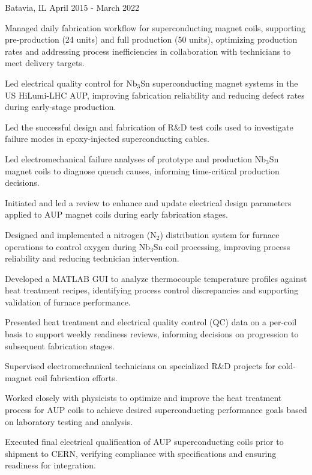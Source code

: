 \begin{cventries}
{Batavia, IL}
{April 2015 - March 2022}
{
\begin{cvitems}
\item {Managed daily fabrication workflow for superconducting magnet coils, supporting pre-production (24 units) and full production (50 units), optimizing production rates and addressing process inefficiencies in collaboration with technicians to meet delivery targets.}
\item {Led electrical quality control for Nb$_3$Sn superconducting magnet systems in the US HiLumi-LHC AUP, improving fabrication reliability and reducing defect rates during early-stage production.}
\item {Led the successful design and fabrication of R\&D test coils used to investigate failure modes in epoxy-injected superconducting cables.}
\item {Led electromechanical failure analyses of prototype and production Nb$_3$Sn magnet coils to diagnose quench causes, informing time-critical production decisions.}
\item {Initiated and led a review to enhance and update electrical design parameters applied to AUP magnet coils during early fabrication stages.}
\item {Designed and implemented a nitrogen (N$_2$) distribution system for furnace operations to control oxygen during Nb$_3$Sn coil processing, improving process reliability and reducing technician intervention.}
\item {Developed a MATLAB GUI to analyze thermocouple temperature profiles against heat treatment recipes, identifying process control discrepancies and supporting validation of furnace performance.}
\item {Presented heat treatment and electrical quality control (QC) data on a per-coil basis to support weekly readiness reviews, informing decisions on progression to subsequent fabrication stages.}
\item {Supervised electromechanical technicians on specialized R\&D projects for cold-magnet coil fabrication efforts.}
\item {Worked closely with physicists to optimize and improve the heat treatment process for AUP coils to achieve desired superconducting performance goals based on laboratory testing and analysis.}
\item {Executed final electrical qualification of AUP superconducting coils prior to shipment to CERN, verifying compliance with specifications and ensuring readiness for integration.}
\end{cvitems}
}
\vspace{3mm}


\end{cventries}
